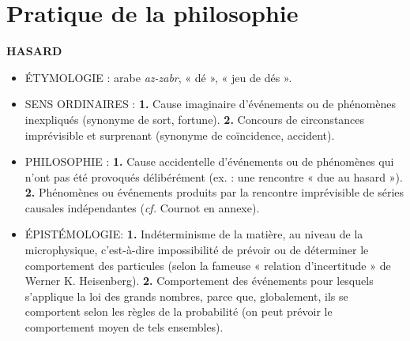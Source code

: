 
\section{Pratique de la philosophie}

{\bf HASARD}

\begin{itemize}[leftmargin=1cm, label=, itemsep=1pt]
\item {\footnotesize ÉTYMOLOGIE} : arabe {\it az-zabr}, « dé », « jeu de dés ».
\item {\footnotesize SENS ORDINAIRES} : {\bf 1.} Cause imaginaire d’événements ou de phénomènes inexpliqués (synonyme de sort, fortune). {\bf 2.} Concours de circonstances imprévisible et surprenant (synonyme de coïncidence, accident).
\item {\footnotesize PHILOSOPHIE} : {\bf 1.} Cause accidentelle d'événements ou de
phénomènes qui n'ont pas été provoqués délibérément (ex. : une rencontre « due au hasard »). {\bf 2.}  Phénomènes ou événements produits par la rencontre imprévisible de
séries causales indépendantes ({\it cf.} Cournot en annexe).
\item {\footnotesize ÉPISTÉMOLOGIE}: {\bf 1.} Indéterminisme de la matière, au
niveau de la microphysique, c'est-à-dire impossibilité de prévoir ou de
déterminer le comportement des particules (selon la fameuse « relation d'incertitude » de Werner K. Heisenberg). {\bf 2.}  Comportement des événements pour lesquels s'applique la loi des grands nombres, parce que, globalement, ils se comportent selon les règles de la
probabilité (on peut prévoir le comportement moyen de tels ensembles).
\end{itemize}

